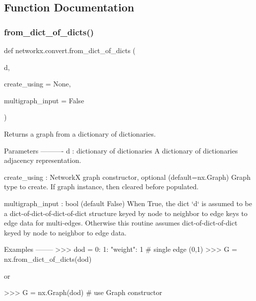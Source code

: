 \subsection{Function Documentation}
\mbox{\label{namespacenetworkx_1_1convert_a4cb3971dd768e641b3395e6d245e2cc3}} 
\subsubsection{\texorpdfstring{from\+\_\+dict\+\_\+of\+\_\+dicts()}{from\_dict\_of\_dicts()}}
{\footnotesize\ttfamily def networkx.\+convert.\+from\+\_\+dict\+\_\+of\+\_\+dicts (\begin{DoxyParamCaption}\item[{}]{d,  }\item[{}]{create\+\_\+using = {\ttfamily None},  }\item[{}]{multigraph\+\_\+input = {\ttfamily False} }\end{DoxyParamCaption})}

\begin{DoxyVerb}Returns a graph from a dictionary of dictionaries.

Parameters
----------
d : dictionary of dictionaries
  A dictionary of dictionaries adjacency representation.

create_using : NetworkX graph constructor, optional (default=nx.Graph)
    Graph type to create. If graph instance, then cleared before populated.

multigraph_input : bool (default False)
   When True, the dict `d` is assumed
   to be a dict-of-dict-of-dict-of-dict structure keyed by
   node to neighbor to edge keys to edge data for multi-edges.
   Otherwise this routine assumes dict-of-dict-of-dict keyed by
   node to neighbor to edge data.

Examples
--------
>>> dod = {0: {1: {"weight": 1}}}  # single edge (0,1)
>>> G = nx.from_dict_of_dicts(dod)

or

>>> G = nx.Graph(dod)  # use Graph constructor\end{DoxyVerb}
 \mbox{\label{namespacenetworkx_1_1convert_aa8787aba5fcf3417c6602bb7205bce4f}} 

